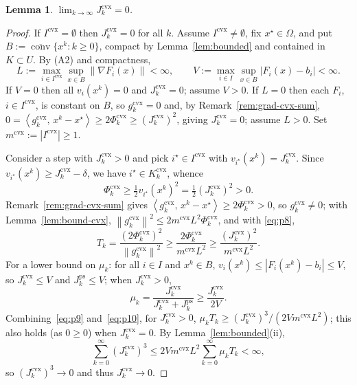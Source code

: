 \documentclass[]{interact}
\theoremstyle{plain}
\newtheorem{lemma}[theorem]{Lemma}
\theoremstyle{definition}
\theoremstyle{remark}
\newcommand{\norm}[1]{\left\lVert #1 \right\rVert}
\newcommand{\abs}[1]{\left\lvert #1 \right\rvert}
\newcommand{\inner}[2]{\left\langle #1,\, #2 \right\rangle}
\DeclareMathOperator{\conv}{conv}
\newcommand{\cvx}{\mathrm{cvx}}
\newcommand{\ps}{\mathrm{ps}}
\begin{document}
\begin{lemma}\label{lem:jcvx0}
$\displaystyle\lim_{k\to\infty}J^{\cvx}_k=0$.
\end{lemma}
\begin{proof}
If $I^{\cvx}=\emptyset$ then $J^{\cvx}_k=0$ for all $k$. Assume $I^{\cvx}\ne\emptyset$, fix
$x^\star\in\Omega$, and put $B:=\overline{\conv}\{x^k:k\ge0\}$, compact by Lemma~\ref{lem:bounded} and contained
in $K\subset U$. By (A2) and
compactness,
\[
L:=\max_{i\in I^{\cvx}}\sup_{x\in B}\norm{\nabla F_i(x)}<\infty,\qquad
V:=\max_{i\in I}\sup_{x\in B}\abs{F_i(x)-b_i}<\infty.
\]
If $V=0$ then all $v_i(x^k)=0$ and
$J^{\cvx}_k=0$; assume $V>0$. If $L=0$ then each $F_i$, $i\in I^{\cvx}$, is constant on
$B$, so $g^{\cvx}_k=0$ and, by Remark~\ref{rem:grad-cvx-sum},
$0=\inner{g^{\cvx}_k}{x^k-x^\star}\ge 2\Phi^{\cvx}_k\ge(J^{\cvx}_k)^2$, giving
$J^{\cvx}_k=0$; assume $L>0$. Set $m^{\cvx}:=\abs{I^{\cvx}}\ge1$.

Consider a step with $J^{\cvx}_k>0$ and pick $i^\star\in I^{\cvx}$ with
$v_{i^\star}(x^k)=J^{\cvx}_k$. Since $v_{i^\star}(x^k)\ge J^{\cvx}_k-\delta$, we have
$i^\star\in K^{\cvx}_k$, whence
\begin{equation}\label{eq:p8}
\Phi^{\cvx}_k\ge\tfrac12 v_{i^\star}(x^k)^2=\tfrac12(J^{\cvx}_k)^2>0 .
\end{equation}
Remark~\ref{rem:grad-cvx-sum} gives
$\inner{g^{\cvx}_k}{x^k-x^\star}\ge2\Phi^{\cvx}_k>0$, so $g^{\cvx}_k\ne0$; with
Lemma~\ref{lem:bound-cvx}, $\norm{g^{\cvx}_k}^2\le2m^{\cvx}L^2\Phi^{\cvx}_k$, and with
\eqref{eq:p8},
\begin{equation}\label{eq:p9}
T_k=\frac{(2\Phi^{\cvx}_k)^2}{\norm{g^{\cvx}_k}^2}\ge\frac{2\Phi^{\cvx}_k}{m^{\cvx}L^2}\ge\frac{(J^{\cvx}_k)^2}{m^{\cvx}L^2}.
\end{equation}
For a lower bound on $\mu_k$: for all $i\in I$ and $x^k\in B$,
$v_i(x^k)\le\abs{F_i(x^k)-b_i}\le V$, so $J^{\cvx}_k\le V$ and $J^{\ps}_k\le V$; when
$J^{\cvx}_k>0$,
\begin{equation}\label{eq:p10}
\mu_k=\frac{J^{\cvx}_k}{J^{\cvx}_k+J^{\ps}_k}\ge\frac{J^{\cvx}_k}{2V}.
\end{equation}
Combining~\eqref{eq:p9} and~\eqref{eq:p10}, for $J^{\cvx}_k>0$,
$\mu_k T_k\ge(J^{\cvx}_k)^3/(2Vm^{\cvx}L^2)$; this also holds (as $0\ge0$) when
$J^{\cvx}_k=0$. By Lemma~\ref{lem:bounded}(ii),
\begin{equation}\label{eq:p12}
\sum_{k=0}^\infty(J^{\cvx}_k)^3\le 2Vm^{\cvx}L^2\sum_{k=0}^\infty\mu_k T_k<\infty,
\end{equation}
so $(J^{\cvx}_k)^3\to0$ and thus $J^{\cvx}_k\to0$.
\end{proof}
\end{document}
